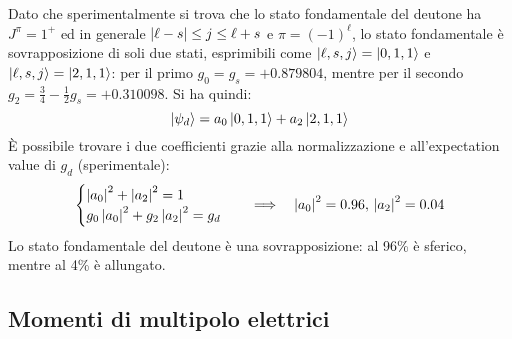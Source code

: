 Dato che sperimentalmente si trova che lo stato fondamentale del deutone ha $ J^{\pi} = 1^+ $ ed in generale $ \left\lvert\ell - s\right\rvert \le j \le \ell + s $ e $ \pi = (-1)^{\ell} $, lo stato fondamentale è sovrapposizione di soli due stati, esprimibili come $ \ket{\ell,s,j} = \ket{0,1,1} $ e $ \ket{\ell,s,j} = \ket{2,1,1} $: per il primo $ g_0 = g_s = +0.879804 $, mentre per il secondo $ g_2 = \frac{3}{4} - \frac{1}{2} g_s = +0.310098 $. Si ha quindi:
\begin{equation}
	\ket{\psi_d} = a_0 \ket{0,1,1} + a_2 \ket{2,1,1}
	\label{eq:4.15}
\end{equation}
È possibile trovare i due coefficienti grazie alla normalizzazione e all'expectation value di $ g_d $ (sperimentale):
\begin{equation*}
	\begin{cases}
		\left\lvert a_0\right\rvert^2 + \left\lvert a_2\right\rvert^2 = 1 \\
		g_0 \left\lvert a_0\right\rvert^2 + g_2 \left\lvert a_2\right\rvert^2 = g_d
	\end{cases}
	\quad\Longrightarrow\quad
	\left\lvert a_0\right\rvert^2 = 0.96,\, \left\lvert a_2\right\rvert^2 = 0.04
\end{equation*}
Lo stato fondamentale del deutone è una sovrapposizione: al 96\% è sferico, mentre al 4\% è allungato.

\subsection{Momenti di multipolo elettrici}

